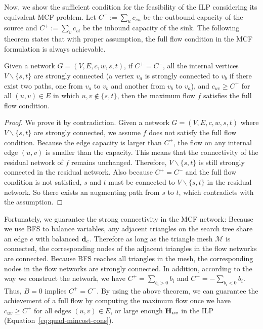 Now, we show the sufficient condition for the feasibility of the ILP considering its equivalent MCF problem. Let $C^-:=\sum_u c_{su}$ be the outbound capacity of the source and $C^+:=\sum_v c_{vt}$ be the inbound capacity of the sink.  The following theorem states that with proper assumption, the full flow condition in the MCF formulation is always achievable.
\begin{theorem}
Given a network $G=(V, E, c, w, s, t)$, if $C^+=C^-$, all the internal vertices $V \backslash \{s,t\}$ are strongly connected (a vertex $v_a$ is strongly connected to $v_b$ if there exist two paths, one from $v_a$ to $v_b$ and another from $v_b$ to $v_a$), and $c_{uv} \ge C^+$ for all $(u,v) \in E$ in which $u,v \notin  \{s,t\}$, then the maximum flow $f$ satisfies the full flow condition.
\label{th:connect}
\end{theorem}

\begin{proof}
We prove it by contradiction. Given a network $G=(V, E, c, w, s, t)$ where $V \backslash \{s,t\}$ are strongly connected, we assume $f$ does not satisfy the full flow condition.  Because the edge capacity is larger than $C^+$, the flow on any internal edge $(u,v)$ is smaller than the capacity.  This means that the connectivity of the residual network of $f$ remains unchanged.  Therefore, $V \backslash \{s,t\}$ is still strongly connected in the residual network. Also because $C^+=C^-$ and the full flow condition is not satisfied, $s$ and $t$ must be connected to $V \backslash \{s,t\}$ in the residual network.  So there exists an augmenting path from $s$ to $t$, which contradicts with the assumption.
\end{proof}

Fortunately, we guarantee the strong connectivity in the MCF network: Because we use BFS to balance variables, any adjacent triangles on the search tree share an edge $e$ with balanced ${\mathbf{d}}_e$. Therefore as long as the triangle mesh $\mathcal{M}$ is connected, the corresponding nodes of the adjacent triangles in the flow networks are connected. Because BFS reaches all triangles in the mesh, the corresponding nodes in the flow networks are strongly connected.  In addition, according to the way we construct the network, we have $C^+ = \sum_{b_i > 0}b_i$ and $C^- = -\sum_{b_i < 0} b_i$.  Thus, $B=0$ implies $C^+ = C^-$. By using the above theorem, we can guarantee the achievement of a full flow by computing the maximum flow once we have $c_{uv} \geq C^+$ for all edges $(u,v) \in E$, or large enough $\mathbf{H}_{uv}$ in the ILP (Equation~\ref{eq:quad-mincost-cons}).

